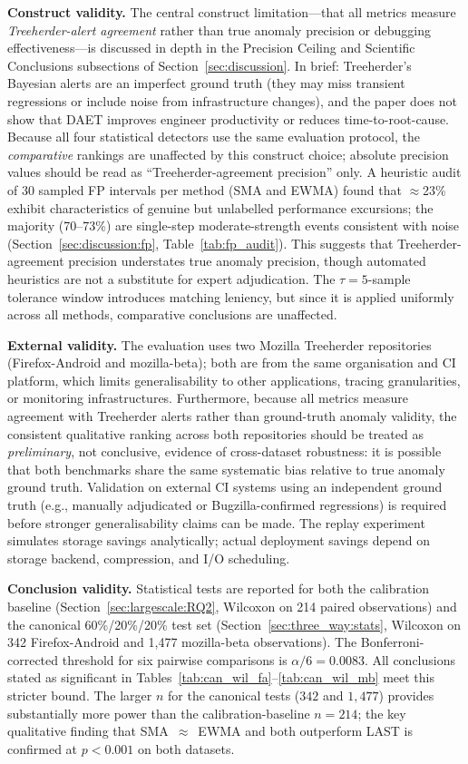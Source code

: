 \documentclass[a4paper,fleqn]{cas-sc}
\theoremstyle{plain}
\begin{document}
\textbf{Construct validity.}
The central construct limitation---that all metrics measure
\emph{Treeherder-alert agreement} rather than true anomaly precision or
debugging effectiveness---is discussed in depth in the Precision Ceiling
and Scientific Conclusions subsections of Section~\ref{sec:discussion}.
In brief: Treeherder's Bayesian alerts are an imperfect ground truth
(they may miss transient regressions or include noise from infrastructure
changes), and the paper does not show that DAET improves engineer
productivity or reduces time-to-root-cause.
Because all four statistical detectors use the same evaluation protocol,
the \emph{comparative} rankings are unaffected by this construct choice;
absolute precision values should be read as ``Treeherder-agreement
precision'' only.
A heuristic audit of 30 sampled FP intervals per method (SMA and EWMA)
found that $\approx$23\% exhibit characteristics of genuine but unlabelled
performance excursions; the majority (70--73\%) are single-step
moderate-strength events consistent with noise
(Section~\ref{sec:discussion:fp}, Table~\ref{tab:fp_audit}).
This suggests that Treeherder-agreement precision understates true anomaly
precision, though automated heuristics are not a substitute for expert adjudication.
The $\tau=5$-sample tolerance window introduces matching leniency, but
since it is applied uniformly across all methods, comparative conclusions
are unaffected.

\textbf{External validity.}
The evaluation uses two Mozilla Treeherder repositories (Firefox-Android and
mozilla-beta); both are from the same organisation and CI platform, which
limits generalisability to other applications, tracing granularities,
or monitoring infrastructures.
Furthermore, because all metrics measure agreement with Treeherder alerts
rather than ground-truth anomaly validity, the consistent qualitative ranking
across both repositories should be treated as \emph{preliminary}, not
conclusive, evidence of cross-dataset robustness: it is possible that
both benchmarks share the same systematic bias relative to true anomaly
ground truth.
Validation on external CI systems using an independent ground truth
(e.g., manually adjudicated or Bugzilla-confirmed regressions) is
required before stronger generalisability claims can be made.
The replay experiment simulates storage savings analytically; actual
deployment savings depend on storage backend, compression, and I/O scheduling.

\textbf{Conclusion validity.}
Statistical tests are reported for both the calibration baseline
(Section~\ref{sec:largescale:RQ2}, Wilcoxon on 214 paired observations)
and the canonical 60\%/20\%/20\% test set
(Section~\ref{sec:three_way:stats}, Wilcoxon on 342 Firefox-Android
and 1{,}477 mozilla-beta observations).
The Bonferroni-corrected threshold for six pairwise comparisons is
$\alpha/6 = 0.0083$.
All conclusions stated as significant in
Tables~\ref{tab:can_wil_fa}--\ref{tab:can_wil_mb}
meet this stricter bound.
The larger $n$ for the canonical tests ($342$ and $1{,}477$)
provides substantially more power than the calibration-baseline $n=214$;
the key qualitative finding that SMA~$\approx$~EWMA and both outperform
LAST is confirmed at $p < 0.001$ on both datasets.
\end{document}
